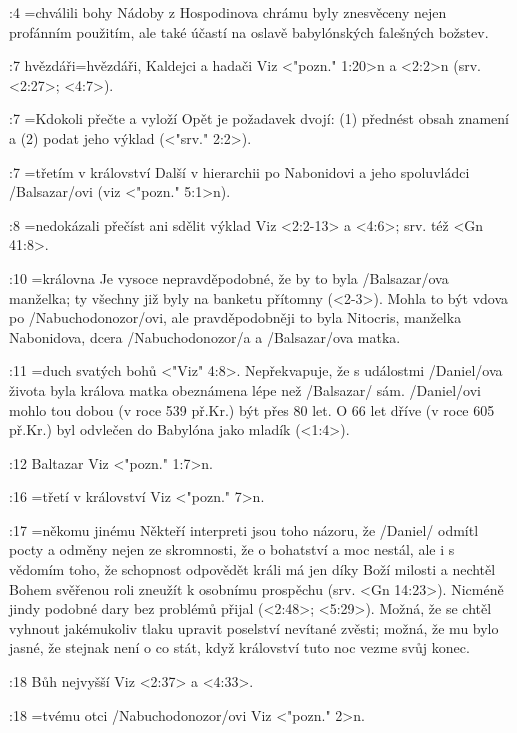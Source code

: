 :4 {}={chválili bohy} Nádoby z Hospodinova chrámu byly znesvěceny nejen profánním použitím, ale také účastí na oslavě babylónských falešných božstev. 
     
:7 {hvězdáři}={hvězdáři, Kaldejci a hadači} Viz  <"pozn." 1:20>n a  <2:2>n (srv. <2:27>; <4:7>). 
     
:7 {}={Kdokoli přečte a vyloží} Opět je požadavek dvojí: (1) přednést obsah znamení a (2) podat jeho výklad  (<"srv." 2:2>).      
     
:7 {}={třetím v království} Další v hierarchii po Nabonidovi a jeho spoluvládci \x/Balsazar/ovi  (viz <"pozn." 5:1>n).     
     
:8 {}={nedokázali přečíst ani sdělit výklad} Viz  <2:2-13> a  <4:6>; srv. též <Gn 41:8>.   
 
:10 {}={královna} Je vysoce nepravděpodobné, že by to byla \x/Balsazar/ova manželka; ty všechny již byly na banketu přítomny  (<2-3>). Mohla to být vdova po \x/Nabuchodonozor/ovi, ale pravděpodobněji to byla  Nitocris, manželka Nabonidova, dcera \x/Nabuchodonozor/a a \x/Balsazar/ova matka.
     
:11 {}={duch svatých bohů}   <"Viz" 4:8>. 
Nepřekvapuje, že s událostmi \x/Daniel/ova života byla králova matka obeznámena lépe než  \x/Balsazar/ sám. \x/Daniel/ovi mohlo tou dobou (v roce 539 př.Kr.) být přes 80 let. O 66 let dříve (v roce 605 př.Kr.) byl odvlečen do Babylóna jako mladík (<1:4>).     
     
     
:12 {Baltazar} Viz <"pozn." 1:7>n.     
     
:16 {}={třetí v království} Viz  <"pozn." 7>n.     
     
:17 {}={někomu jinému} Někteří interpreti jsou toho názoru, že \x/Daniel/ odmítl pocty a odměny nejen ze skromnosti, že o bohatství a moc nestál, ale i s vědomím toho, že schopnost odpovědět králi má jen díky Boží milosti a nechtěl Bohem svěřenou roli zneužít k osobnímu prospěchu (srv. <Gn 14:23>). Nicméně jindy podobné dary bez problémů přijal (<2:48>; <5:29>). Možná, že se chtěl vyhnout jakémukoliv tlaku upravit poselství nevítané zvěsti; možná, že mu bylo jasné, že stejnak není o co stát, když království tuto noc vezme svůj konec.
     
:18 {Bůh nejvyšší}   Viz <2:37> a  <4:33>.     
     
:18 {}={tvému otci \x/Nabuchodonozor/ovi}   Viz <"pozn." 2>n.
     
